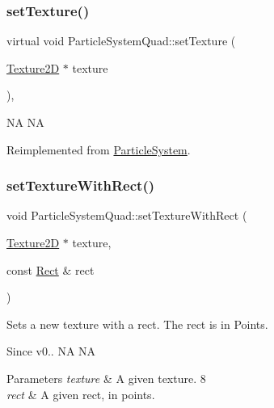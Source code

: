 \subsubsection{\texorpdfstring{set\+Texture()}{setTexture()}\hspace{0.1cm}{\footnotesize\ttfamily [2/2]}}
{\footnotesize\ttfamily virtual void Particle\+System\+Quad\+::set\+Texture (\begin{DoxyParamCaption}\item[{\hyperlink{classTexture2D}{Texture2D} $\ast$}]{texture }\end{DoxyParamCaption})\hspace{0.3cm}{\ttfamily [override]}, {\ttfamily [virtual]}}

NA  NA 

Reimplemented from \hyperlink{classParticleSystem}{Particle\+System}.

\mbox{\label{classParticleSystemQuad_a496325dbe905d3359382c149b04d8f9b}} 
\subsubsection{\texorpdfstring{set\+Texture\+With\+Rect()}{setTextureWithRect()}\hspace{0.1cm}{\footnotesize\ttfamily [1/2]}}
{\footnotesize\ttfamily void Particle\+System\+Quad\+::set\+Texture\+With\+Rect (\begin{DoxyParamCaption}\item[{\hyperlink{classTexture2D}{Texture2D} $\ast$}]{texture,  }\item[{const \hyperlink{classRect}{Rect} \&}]{rect }\end{DoxyParamCaption})}

Sets a new texture with a rect. The rect is in Points. \begin{DoxySince}{Since}
v0..  NA  NA
\end{DoxySince}

\begin{DoxyParams}{Parameters}
{\em texture} & A given texture. 8 \\
\hline
{\em rect} & A given rect, in points. \\
\hline
\end{DoxyParams}
\mbox{\label{classParticleSystemQuad_a496325dbe905d3359382c149b04d8f9b}} 
